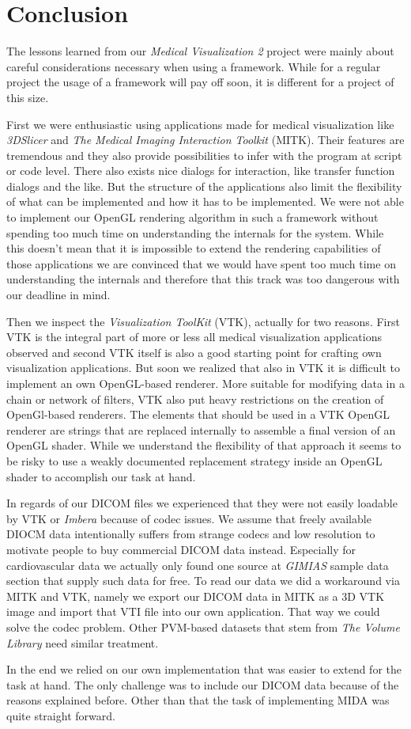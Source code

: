 \section{Conclusion}

The lessons learned from our \emph{Medical Visualization 2} project were mainly about careful considerations necessary when using a framework.
While for a regular project the usage of a framework will pay off soon, it is different for a project of this size.

First we were enthusiastic using applications made for medical visualization like \emph{3DSlicer} and \emph{The Medical Imaging Interaction Toolkit} (MITK). Their features are tremendous and they also provide possibilities to infer with the program at script or code level. There also exists nice dialogs for interaction, like transfer function dialogs and the like.
But the structure of the applications also limit the flexibility of what can be implemented and how it has to be implemented.
We were not able to implement our OpenGL rendering algorithm in such a framework without spending too much time on understanding the internals for the system. While this doesn't mean that it is impossible to extend the rendering capabilities of those applications we are convinced that we would have spent too much time on understanding the internals and therefore that this track was too dangerous with our deadline in mind. 

Then we inspect the \emph{Visualization ToolKit} (VTK), actually for two reasons. First VTK is the integral part of more or less all medical visualization applications observed and second VTK itself is also a good starting point for crafting own visualization applications.
But soon we realized that also in VTK it is difficult to implement an own OpenGL-based renderer. More suitable for modifying data in a chain or network of filters, VTK also put heavy restrictions on the creation of OpenGl-based renderers. The elements that should be used in a VTK OpenGL renderer are strings that are replaced internally to assemble a final version of an OpenGL shader. While we understand the flexibility of that approach it seems to be risky to use a weakly documented replacement strategy inside an OpenGL shader to accomplish our task at hand.  

In regards of our DICOM files we experienced that they were not easily loadable by VTK or \emph{Imbera} because of codec issues. We assume that freely available DIOCM data intentionally suffers from strange codecs and low resolution to motivate people to buy commercial DICOM data instead.
Especially for cardiovascular data we actually only found one source at \emph{GIMIAS} \cite{gimias_sampledata_2018} sample data section that supply such data for free.
To read our data we did a workaround via MITK and VTK, namely we export our DICOM data in MITK as a 3D VTK image and import that VTI file into our own application. That way we could solve the codec problem. Other PVM-based datasets that stem from \emph{The Volume Library}\cite{roettger_VOL_2018} need similar treatment.

In the end we relied on our own implementation that was easier to extend for the task at hand. The only challenge was to include our DICOM data because of the reasons explained before. Other than that the task of implementing MIDA was quite straight forward.

